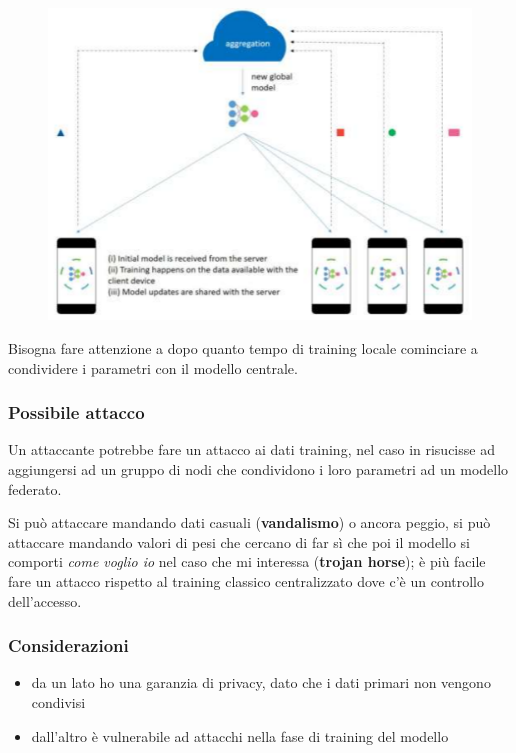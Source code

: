\documentclass{report}
\begin{document}
\begin{figure}[H]
    \centering
    \includegraphics[width=0.8\linewidth]{images/fedrated-learning.png}
\end{figure}

\noindent Bisogna fare attenzione a dopo quanto tempo di training locale cominciare a condividere i parametri 
con il modello centrale.

\subsubsection{Possibile attacco}
Un attaccante potrebbe fare un attacco ai dati training, nel caso in risucisse ad aggiungersi ad un gruppo di nodi che condividono i loro 
parametri ad un modello federato.

\noindent Si può attaccare mandando dati casuali (\textbf{vandalismo}) o ancora peggio, si può attaccare mandando valori di pesi che cercano di 
far sì che poi il modello si comporti \textit{come voglio io} nel caso che mi interessa (\textbf{trojan horse}); è più facile fare un attacco 
rispetto al training classico centralizzato dove c'è un controllo dell'accesso.

\subsubsection{Considerazioni}

\begin{itemize}
    \item da un lato ho una garanzia di privacy, dato che i dati primari non vengono condivisi
    \item dall'altro è vulnerabile ad attacchi nella fase di training del modello 
\end{itemize}
\end{document}
